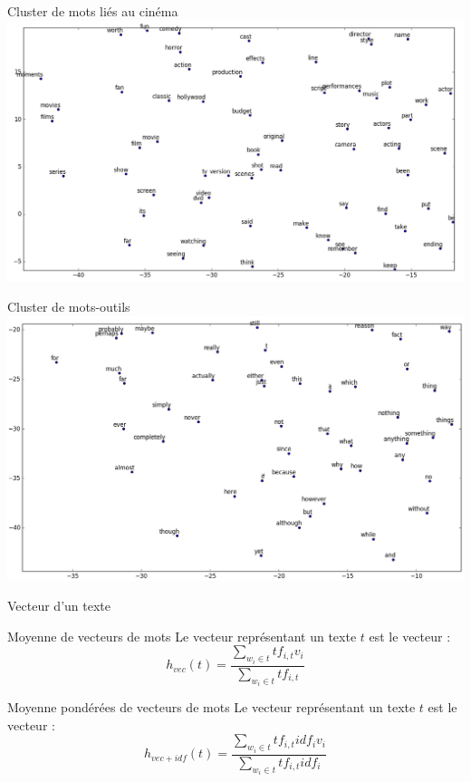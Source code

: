 \documentclass{beamer}
\begin{document}
\begin{frame}{Cluster de mots liés au cinéma}
\includegraphics[scale=0.35]{images/cluster_cinema.png}
\end{frame}

\begin{frame}{Cluster de mots-outils}
\includegraphics[scale=0.35]{images/cluster_toolwords.png}
\end{frame}

\begin{frame}{Vecteur d'un texte}
\begin{block}{Moyenne de vecteurs de mots}
Le vecteur représentant un texte $t$ est le vecteur :
$$
h_{vec}(t) = \frac{\sum_{w_{i} \in t}{tf_{i, t}v_{i}}}{\sum_{w_{i} \in t}{tf_{i, t}}} 
$$
\end{block}

\begin{block}{Moyenne pondérées de vecteurs de mots}
Le vecteur représentant un texte $t$ est le vecteur :
$$
h_{vec+idf}(t) = \frac{\sum_{w_{i} \in t}{tf_{i, t}idf_{i}v_{i}}}{\sum_{w_{i} \in t}{tf_{i, t}idf_{i}}}
$$
\end{block}
\end{frame}
\end{document}
